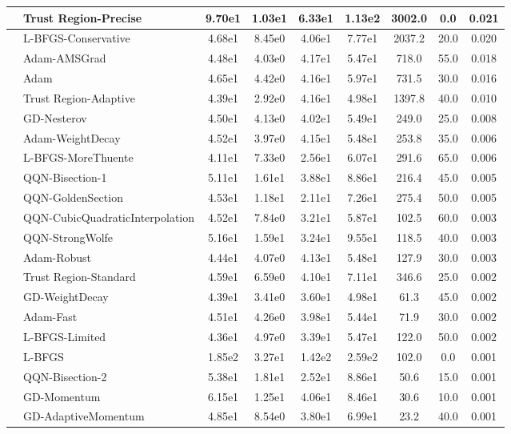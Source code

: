 \documentclass[10pt]{article}
\begin{document}
\begin{longtable}{|l|l|c|c|c|c|c|c|c|}
\hline
 & Trust Region-Precise & 9.70e1 & 1.03e1 & 6.33e1 & 1.13e2 & 3002.0 & 0.0 & 0.021 \\
\hline
 & L-BFGS-Conservative & 4.68e1 & 8.45e0 & 4.06e1 & 7.77e1 & 2037.2 & 20.0 & 0.020 \\
\hline
 & Adam-AMSGrad & 4.48e1 & 4.03e0 & 4.17e1 & 5.47e1 & 718.0 & 55.0 & 0.018 \\
\hline
 & Adam & 4.65e1 & 4.42e0 & 4.16e1 & 5.97e1 & 731.5 & 30.0 & 0.016 \\
\hline
 & Trust Region-Adaptive & 4.39e1 & 2.92e0 & 4.16e1 & 4.98e1 & 1397.8 & 40.0 & 0.010 \\
\hline
 & GD-Nesterov & 4.50e1 & 4.13e0 & 4.02e1 & 5.49e1 & 249.0 & 25.0 & 0.008 \\
\hline
 & Adam-WeightDecay & 4.52e1 & 3.97e0 & 4.15e1 & 5.48e1 & 253.8 & 35.0 & 0.006 \\
\hline
 & L-BFGS-MoreThuente & 4.11e1 & 7.33e0 & 2.56e1 & 6.07e1 & 291.6 & 65.0 & 0.006 \\
\hline
 & QQN-Bisection-1 & 5.11e1 & 1.61e1 & 3.88e1 & 8.86e1 & 216.4 & 45.0 & 0.005 \\
\hline
 & QQN-GoldenSection & 4.53e1 & 1.18e1 & 2.11e1 & 7.26e1 & 275.4 & 50.0 & 0.005 \\
\hline
 & QQN-CubicQuadraticInterpolation & 4.52e1 & 7.84e0 & 3.21e1 & 5.87e1 & 102.5 & 60.0 & 0.003 \\
\hline
 & QQN-StrongWolfe & 5.16e1 & 1.59e1 & 3.24e1 & 9.55e1 & 118.5 & 40.0 & 0.003 \\
\hline
 & Adam-Robust & 4.44e1 & 4.07e0 & 4.13e1 & 5.48e1 & 127.9 & 30.0 & 0.003 \\
\hline
 & Trust Region-Standard & 4.59e1 & 6.59e0 & 4.10e1 & 7.11e1 & 346.6 & 25.0 & 0.002 \\
\hline
 & GD-WeightDecay & 4.39e1 & 3.41e0 & 3.60e1 & 4.98e1 & 61.3 & 45.0 & 0.002 \\
\hline
 & Adam-Fast & 4.51e1 & 4.26e0 & 3.98e1 & 5.44e1 & 71.9 & 30.0 & 0.002 \\
\hline
 & L-BFGS-Limited & 4.36e1 & 4.97e0 & 3.39e1 & 5.47e1 & 122.0 & 50.0 & 0.002 \\
\hline
 & L-BFGS & 1.85e2 & 3.27e1 & 1.42e2 & 2.59e2 & 102.0 & 0.0 & 0.001 \\
\hline
 & QQN-Bisection-2 & 5.38e1 & 1.81e1 & 2.52e1 & 8.86e1 & 50.6 & 15.0 & 0.001 \\
\hline
 & GD-Momentum & 6.15e1 & 1.25e1 & 4.06e1 & 8.46e1 & 30.6 & 10.0 & 0.001 \\
\hline
 & GD-AdaptiveMomentum & 4.85e1 & 8.54e0 & 3.80e1 & 6.99e1 & 23.2 & 40.0 & 0.001 \\

\end{longtable}
\end{document}
